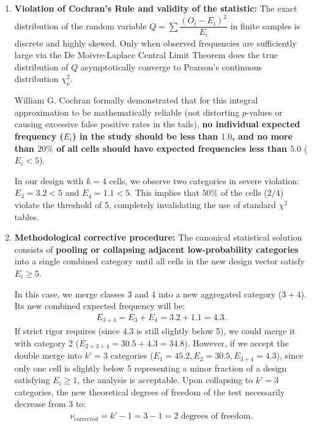 \begin{solproblema}
	\begin{enumerate}
		\item \textbf{Violation of Cochran's Rule and validity of the statistic:}
		The exact distribution of the random variable $Q = \sum \dfrac{(O_i - E_i)^2}{E_i}$ in finite samples is discrete and highly skewed. Only when observed frequencies are sufficiently large via the De Moivre-Laplace Central Limit Theorem does the true distribution of $Q$ asymptotically converge to Pearson's continuous distribution $\chi^2_\nu$.
		
		William G. Cochran formally demonstrated that for this integral approximation to be mathematically reliable (not distorting $p$-values or causing excessive false positive rates in the tails), \textbf{no individual expected frequency ($E_i$) in the study should be less than $1.0$, and no more than $20\%$ of all cells should have expected frequencies less than $5.0$} ($E_i < 5$).
		
		In our design with $k=4$ cells, we observe two categories in severe violation: $E_3 = 3.2 < 5$ and $E_4 = 1.1 < 5$. This implies that $50\%$ of the cells ($2 / 4$) violate the threshold of 5, completely invalidating the use of standard $\chi^2$ tables.
		
		\item \textbf{Methodological corrective procedure:}
		The canonical statistical solution consists of \textbf{pooling or collapsing adjacent low-probability categories} into a single combined category until all cells in the new design vector satisfy $E_i \ge 5$.
		
		In this case, we merge classes 3 and 4 into a new aggregated category ($3+4$). Its new combined expected frequency will be:
		\begin{align}
			E_{3+4} = E_3 + E_4 = 3.2 + 1.1 = 4.3.
		\end{align}
		If strict rigor requires (since $4.3$ is still slightly below 5), we could merge it with category 2 ($E_{2+3+4} = 30.5 + 4.3 = 34.8$). However, if we accept the double merge into $k' = 3$ categories ($E_1 = 45.2, E_2 = 30.5, E_{3+4} = 4.3$), since only one cell is slightly below 5 representing a minor fraction of a design satisfying $E_i \ge 1$, the analysis is acceptable.
		Upon collapsing to $k' = 3$ categories, the new theoretical degrees of freedom of the test necessarily decrease from $3$ to:
		\begin{align}
			\nu_{\text{corrected}} = k' - 1 = 3 - 1 = 2 \text{ degrees of freedom.}
		\end{align}
	\end{enumerate}
\end{solproblema}


